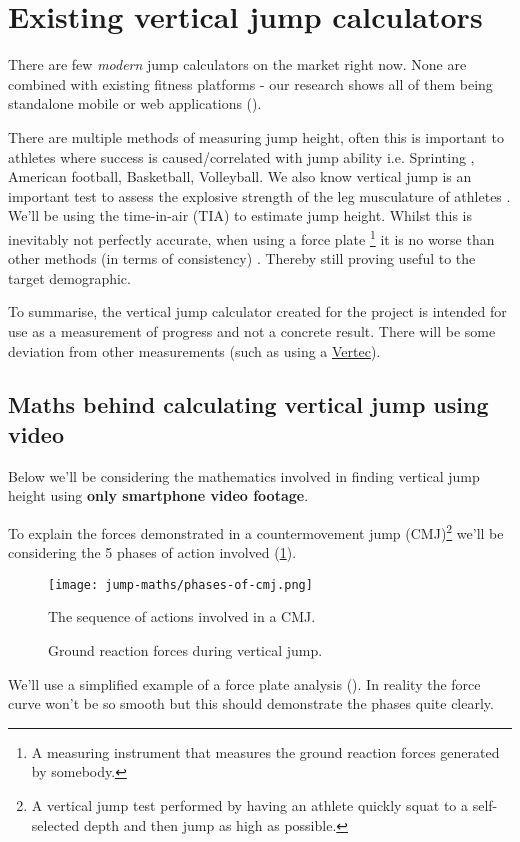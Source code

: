 \section{Existing vertical jump calculators}
There are few \textit{modern} jump calculators on the market right now. None are combined with existing fitness platforms -
our research shows all of them being standalone mobile or web applications ().
\par
There are multiple methods of measuring jump height, often this is important to athletes 
where success is caused/correlated with jump ability i.e. Sprinting \cite{jump-sprint-link}, American football, Basketball, Volleyball.
We also know vertical jump is an important test to assess the explosive strength of the leg
musculature of athletes \cite{aspects-of-strength,nsa-strength-in-athletes}.
We'll be using the time-in-air (TIA) to estimate jump height. Whilst this is inevitably not perfectly
accurate, when using a force plate \footnote{A measuring instrument that measures the ground reaction forces generated by somebody.}
it is no worse than other methods (in terms of consistency) \cite{measuring-jump-paper}.
Thereby still proving useful to the target demographic.
\par
To summarise, the vertical jump calculator created for the project is intended for use as a measurement of progress
and not a concrete result. There will be some deviation from other measurements (such as using a \href{https://www.topendsports.com/testing/products/vertical-jump/vertec.htm}{Vertec}).
\pagebreak 

\subsection{Maths behind calculating vertical jump using video}
\label{research:jump-maths}
Below we'll be considering the mathematics involved in finding vertical jump height using
\textbf{only smartphone video footage}.
\par
To explain the forces demonstrated in a countermovement jump (CMJ)\footnote{A vertical jump test performed by having an athlete quickly squat to a self-selected depth and then jump as high as possible.}
we'll be considering the 5 phases of action involved (\cref{fig:jump-phases}).
\begin{figure}[H]
	\centering
	\texttt{[image: jump-maths/phases-of-cmj.png]}
	\caption{The sequence of actions involved in a CMJ.}
	\label{fig:jump-phases}
\end{figure}
\vspace*{-5mm}
\begin{figure}[H]
	\centering
	
	\caption{Ground reaction forces during vertical jump.}
	\label{fig:jump-phases-graph}
\end{figure}
\par
We'll use a simplified example of a force plate analysis (). In reality the force curve won't be so smooth
but this should demonstrate the phases quite clearly. 




